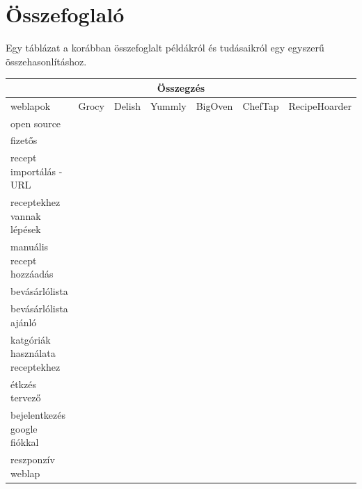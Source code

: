 \documentclass[12pt]{report}
\theoremstyle{definition}
\begin{document}
\section{Összefoglaló}
Egy táblázat a korábban összefoglalt példákról és tudásaikról egy egyszerű összehasonlításhoz.

\newcommand{\cmark}{\ding{51}}%
\newcommand{\xmark}{\ding{55}}%

\noindent
\begin{tabular}{p{3cm} | c c c c c | c | @{}}
	\multicolumn{7}{c}{Összegzés}                                                                   \\ \midrule
	weblapok                         & Grocy  & Delish & Yummly & BigOven & ChefTap & RecipeHoarder \\ \cmidrule[2pt](r){2-7}
	open source                      & \cmark & \xmark & \xmark & \xmark  & \xmark  & \xmark \footnotemark\\\cmidrule(r){2-7}
	fizetős                          & \xmark & \xmark & \xmark & \cmark  & \cmark  & \xmark \footnotemark\\\cmidrule(r){2-7}
	recept importálás - URL          & \xmark & \xmark & \xmark & \cmark  & \cmark  & \cmark        \\ \cmidrule(r){2-7}
	receptekhez vannak lépések       & \xmark & \cmark & \cmark & \xmark  & \cmark  & \cmark        \\ \cmidrule(r){2-7}
	manuális recept hozzáadás        & \cmark & \xmark & \xmark & \cmark  & \cmark  & \cmark        \\ \cmidrule(r){2-7}
	bevásárlólista                   & \cmark & \xmark & \cmark & \cmark  & \cmark  & \cmark        \\ \cmidrule(r){2-7}
	bevásárlólista ajánló            & \cmark & \xmark & \xmark & \xmark  & \xmark  & \cmark        \\ \cmidrule(r){2-7}
	katgóriák használata receptekhez & \xmark & \cmark & \cmark & \xmark  & \cmark  & \cmark        \\ \cmidrule(r){2-7}
	étkzés tervező                   & \cmark & \xmark & \cmark & \xmark  & \xmark  & \xmark        \\ \cmidrule(r){2-7}
	bejelentkezés google fiókkal     & \xmark & \cmark & \cmark & \cmark  & \xmark  & \cmark        \\ \cmidrule(r){2-7}
	reszponzív weblap                & \cmark & \xmark & \xmark & \xmark  & \xmark  & \cmark        \\ \bottomrule
\end{tabular}
\end{document}
